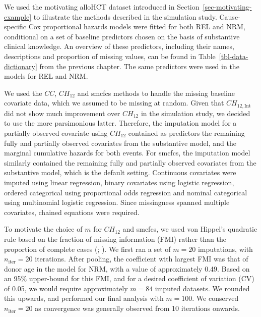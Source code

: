 \documentclass[
  letterpaper,
  DIV=11,
  numbers=noendperiod]{scrreprt}
\begin{document}
We used the motivating alloHCT dataset introduced in
Section~\ref{sec-motivating-example} to illustrate the methods described
in the simulation study. Cause-specific Cox proportional hazards models
were fitted for both REL and NRM, conditional on a set of baseline
predictors chosen on the basis of substantive clinical knowledge. An
overview of these predictors, including their names, descriptions and
proportion of missing values, can be found in
Table~\ref{tbl-data-dictionary} from the previous chapter. The same
predictors were used in the models for REL and NRM.

We used the \(CC\), \(CH_{12}\) and smcfcs methods to handle the missing
baseline covariate data, which we assumed to be missing at random. Given
that \(CH_{12,\text{Int}}\) did not show much improvement over
\(CH_{12}\) in the simulation study, we decided to use the more
parsimonious latter. Therefore, the imputation model for a partially
observed covariate using \(CH_{12}\) contained as predictors the
remaining fully and partially observed covariates from the substantive
model, and the marginal cumulative hazards for both events. For smcfcs,
the imputation model similarly contained the remaining fully and
partially observed covariates from the substantive model, which is the
default setting. Continuous covariates were imputed using linear
regression, binary covariates using logistic regression, ordered
categorical using proportional odds regression and nominal categorical
using multinomial logistic regression. Since missingness spanned
multiple covariates, chained equations were required.

To motivate the choice of \(m\) for \(CH_{12}\) and smcfcs, we used von
Hippel's quadratic rule based on the fraction of missing information
(FMI) rather than the proportion of complete cases
(; ). We first ran a set of \(m = 20\) imputations, with
\(n_{\text{iter}} = 20\) iterations. After pooling, the coefficient with
largest FMI was that of donor age in the model for NRM, with a value of
approximately 0.49. Based on an 95\% upper-bound for this FMI, and for a
desired coefficient of variation (CV) of 0.05, we would require
approximately \(m = 84\) imputed datasets. We rounded this upwards, and
performed our final analysis with \(m = 100\). We conserved
\(n_{\text{iter}} = 20\) as convergence was generally observed from 10
iterations onwards.
\end{document}

